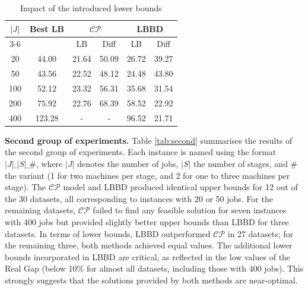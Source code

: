 \documentclass[a4paper,final]{article}
\begin{document}
    \begin{table}[H]
        \centering
        \caption{Impact of the introduced lower bounds}
        \label{tab:lb}
        \begin{tabular}{cccccc}
        \hline
        \multirow{2}{*}{$|J|$} & \multirow{2}{*}{Best LB} & \multicolumn{2}{c}{$\mathcal{CP}$} & \multicolumn{2}{c}{LBBD} \\ \cline{3-6}
            &        & LB       & Diff  & LB    & Diff  \\ \hline
        20  & 44.00  & 21.64    & 50.09 & 26.72 & 39.27 \\
        50  & 43.56  & 22.52     & 48.12 & 24.48 & 43.80 \\
        100 & 52.12  & 23.32 & 56.31 & 35.68 & 31.54 \\
        200 & 75.92  & 22.76    & 68.39 & 58.52 & 22.92 \\
        400 & 123.28 & -        & -     & 96.52 & 21.71 \\ \hline
        \end{tabular}
    \end{table}

    \textbf{Second group of experiments.}
        Table \ref{tab:second} summarises the results of the second group of experiments. Each instance is named using the format $|J|\_|S|\_\#$, where $|J|$ denotes the number of jobs, $|S|$ the number of stages, and $\#$ the variant (1 for two machines per stage, and 2 for one to three machines per stage). The $\mathcal{CP}$ model and LBBD produced identical upper bounds for 12 out of the 30 datasets, all corresponding to instances with 20 or 50 jobs. For the remaining datasets, $\mathcal{CP}$ failed to find any feasible solution for seven instances with 400 jobs but provided slightly better upper bounds than LBBD for three datasets. In terms of lower bounds, LBBD outperformed $\mathcal{CP}$ in 27 datasets; for the remaining three, both methods achieved equal values. The additional lower bounds incorporated in LBBD are critical, as reflected in the low values of the Real Gap (below 10\% for almost all datasets, including those with 400 jobs). This strongly suggests that the solutions provided by both methods are near-optimal.
        
\end{document}
